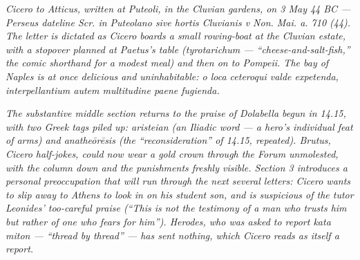 
\textit{Cicero to Atticus, written at Puteoli, in the Cluvian
gardens, on 3 May 44 BC --- Perseus dateline \textit{Scr. in
Puteolano sive hortis Cluvianis v Non. Mai. a. 710 (44)}. The
letter is dictated as Cicero boards a small rowing-boat at the
Cluvian estate, with a stopover planned at Paetus's table
(\textit{tyrotarichum} --- ``cheese-and-salt-fish,'' the comic
shorthand for a modest meal) and then on to Pompeii. The bay of
Naples is at once delicious and uninhabitable: \textit{o loca
ceteroqui valde expetenda, interpellantium autem multitudine
paene fugienda}.}

\textit{The substantive middle section returns to the praise of
Dolabella begun in 14.15, with two Greek tags piled up:
\textit{aristeian} (an Iliadic word --- a hero's individual feat
of arms) and \textit{anathe\=or\=esis} (the ``reconsideration''
of 14.15, repeated). Brutus, Cicero half-jokes, could now wear a
gold crown through the Forum unmolested, with the column down and
the punishments freshly visible. Section 3 introduces a personal
preoccupation that will run through the next several letters:
Cicero wants to slip away to Athens to look in on his student
son, and is suspicious of the tutor Leonides' too-careful
praise (``This is not the testimony of a man who trusts him but
rather of one who fears for him''). Herodes, who was asked to
report \textit{kata miton} --- ``thread by thread'' --- has sent
nothing, which Cicero reads as itself a report.}
